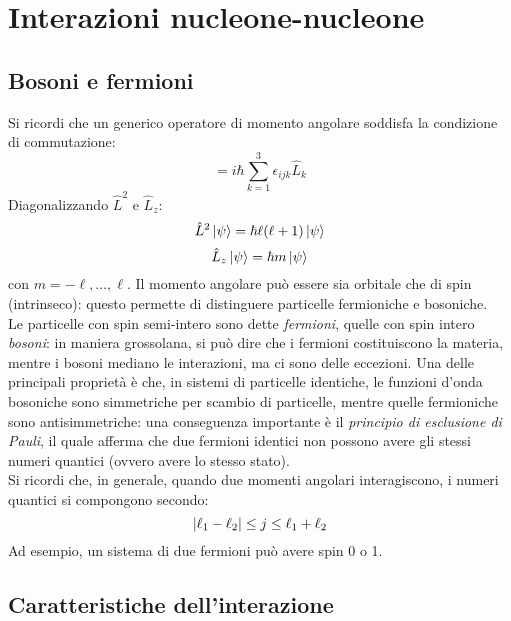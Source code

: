 
\section{Interazioni nucleone-nucleone}

\subsection{Bosoni e fermioni}

Si ricordi che un generico operatore di momento angolare soddisfa la condizione di commutazione:
\begin{equation}
	[\hat{L}_i,\hat{L}_j] = i\hbar \sum_{k = 1}^{3} \epsilon_{ijk} \hat{L}_k
	\label{eq:4.1}
\end{equation}
Diagonalizzando $ \hat{L}^2 $ e $ \hat{L}_z $:
\begin{equation}
	\hat{L}^2 \ket{\psi} = \hbar \ell (\ell + 1) \ket{\psi}
	\label{eq:4.2}
\end{equation}
\begin{equation}
	\hat{L}_z \ket{\psi} = \hbar m \ket{\psi}
	\label{eq:4.3}
\end{equation}
con $ m = -\ell, \dots, \ell $. Il momento angolare può essere sia orbitale che di spin (intrinseco): questo permette di distinguere particelle fermioniche e bosoniche.\\
Le particelle con spin semi-intero sono dette \textit{fermioni}, quelle con spin intero \textit{bosoni}: in maniera grossolana, si può dire che i fermioni costituiscono la materia, mentre i bosoni mediano le interazioni, ma ci sono delle eccezioni. Una delle principali proprietà è che, in sistemi di particelle identiche, le funzioni d'onda bosoniche sono simmetriche per scambio di particelle, mentre quelle fermioniche sono antisimmetriche: una conseguenza importante è il \textit{principio di esclusione di Pauli}, il quale afferma che due fermioni identici non possono avere gli stessi numeri quantici (ovvero avere lo stesso stato).\\
Si ricordi che, in generale, quando due momenti angolari interagiscono, i numeri quantici si compongono secondo:
\begin{equation}
	\left\lvert\ell_1 - \ell_2\right\rvert \le j \le \ell_1 + \ell_2
	\label{eq:4.4}
\end{equation}
Ad esempio, un sistema di due fermioni può avere spin 0 o 1.

\subsection{Caratteristiche dell'interazione}

